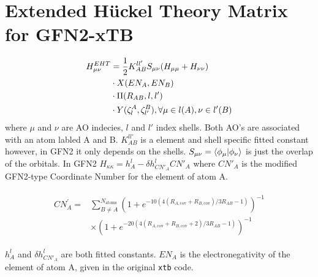 \section{Extended Hückel Theory Matrix for GFN2-xTB}
\begin{equation}
\begin{split}
    H^{EHT}_{\mu\nu} &= \frac{1}{2}K^{ll'}_{AB}S_{\mu\nu}(H_{\mu\mu}+H_{\nu\nu})\\&\cdot X(EN_A,EN_B)\\&\cdot \Pi(R_{AB},l,l')\\&\cdot Y(\zeta^A_l,\zeta^B_{l'}), \forall \mu \in l(A), \nu \in l'(B)
\end{split}
\end{equation}
where $\mu$ and $\nu$ are AO indecies, $l$ and $l'$ index shells. Both AO's are associated with an atom labled A and B. 
$K^{ll'}_{AB}$ is a element and shell specific fitted constant however, in GFN2 it only depends on the shells. 
$S_{\mu\nu}=\braket{\phi_\mu|\phi_\nu}$ is just the overlap of the orbitals. In GFN2 $H_{\kappa\kappa}=h^l_A-\delta h^l_{CN'_A}CN'_A$ where $CN'_A$ is the modified GFN2-type Coordinate Number for the element of atom A.

\begin{align}
\begin{split}
  CN^{'}_A = &\sum^{N_\text{atoms}}_{B \neq A} (1 + e^{-10(4(R_{A,\text{cov}} + R_{B,\text{cov}})/3R_{AB}-1)})^{-1} \\
             &\times (1 + e^{-20(4(R_{A,\text{cov}} + R_{B,\text{cov}} + 2)/3R_{AB}-1)})^{-1}
\end{split}
\end{align}

$h^l_A$ and $\delta h^l_{CN'_A}$ are both fitted constants. $EN_A$ is the electronegativity of the element of atom A, given in the original \texttt{xtb} code. 

